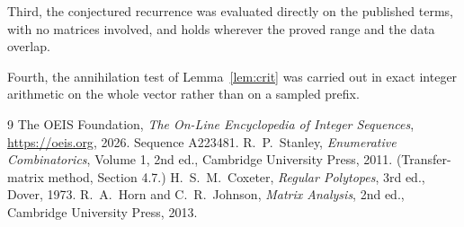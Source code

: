 \documentclass[11pt,a4paper]{article}
\theoremstyle{plain}
\theoremstyle{definition}
\begin{document}
Third, the conjectured recurrence was evaluated directly on the published terms, with no
matrices involved, and holds wherever the proved range and the data overlap.

Fourth, the annihilation test of Lemma~\ref{lem:crit} was carried out in exact integer
arithmetic on the whole vector rather than on a sampled prefix.

\begin{thebibliography}{9}
 The OEIS Foundation, \emph{The On-Line Encyclopedia of Integer
Sequences}, \url{https://oeis.org}, 2026. Sequence A223481.
 R.~P.~Stanley, \emph{Enumerative Combinatorics}, Volume 1, 2nd ed.,
Cambridge University Press, 2011. (Transfer-matrix method, Section 4.7.)
 H.~S.~M.~Coxeter, \emph{Regular Polytopes}, 3rd ed., Dover, 1973.
 R.~A.~Horn and C.~R.~Johnson, \emph{Matrix Analysis}, 2nd ed., Cambridge
University Press, 2013.
\end{thebibliography}
\end{document}
